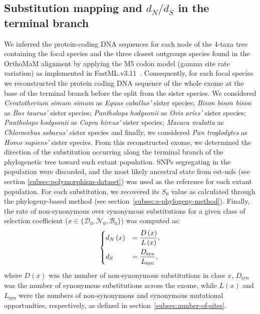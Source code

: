 \documentclass[9pt,twocolumn,twoside,lineno]{pnas-new}
\newcommand{\dn}{d_N}
\newcommand{\ds}{d_S}
\newcommand{\dnds}{\dn / \ds}
\newcommand{\Sphy}{S_{0}}
\newcommand{\SphyDel}{\mathcal{D}_0}
\newcommand{\SphyNeu}{\mathcal{N}_0}
\newcommand{\SphyBen}{\mathcal{B}_0}
\newcommand{\Sphyclass}{x}
\begin{document}
{       \subsection{Substitution mapping and $\dnds$ in the terminal branch}
       \label{subsec:substitution-mapping-in-the-terminal-branch}
       We inferred the protein-coding DNA sequences for each node of the 4-taxa tree containing the focal species and the three closest outgroups species found in the OrthoMaM alignment by applying the M5 codon model (gamma site rate variation) as implemented in FastML.v3.11~\cite{ashkenazy_fastml_2012}.
       Consequently, for each focal species we reconstructed the protein coding DNA sequence of the whole exome at the base of the terminal branch before the split from the sister species.
       We considered \textit{Ceratotherium simum simum} as \textit{Equus caballus'} sister species; \textit{Bison bison bison} as \textit{Bos taurus'} sister species; \textit{Pantholops hodgsonii} as \textit{Ovis aries'} sister species; \textit{Pantholops hodgsonii} as \textit{Capra hircus'} sister species; \textit{Macaca mulatta} as \textit{Chlorocebus sabaeus'} sister species and finally, we considered \textit{Pan troglodytes} as \textit{Homo sapiens'} sister species.
       From this reconstructed exome, we determined the direction of the substitution occurring along the terminal branch of the phylogenetic tree toward each extant population.
       SNPs segregating in the population were discarded, and the most likely ancestral state from est-usfs (see section \ref{subsec:polymorphism-dataset}) was used as the reference for each extant population.
       For each substitution, we recovered its $\Sphy$ value as calculated through the phylogeny-based method (see section~\ref{subsec:s-phylogeny-method}).
       Finally, the rate of non-synonymous over synonymous substitutions for a given class of selection coefficient ($\Sphyclass \in \{\SphyDel, \SphyNeu, \SphyBen \}$) was computed as:
       \begin{align}
              \begin{dcases}
                     \dn \left( \Sphyclass \right) &= \dfrac{D\left( \Sphyclass \right)}{L \left( \Sphyclass \right)}, \\
                     \ds &= \dfrac{D_{\text{syn}}}{L_{\text{syn}}},
              \end{dcases}\label{eq:dnds}
       \end{align}
       where $D \left( \Sphyclass \right) $ was the number of non-synonymous substitutions in class $\Sphyclass$, $D_{\text{syn}}$ was the number of synonymous substitutions across the exome, while $L \left( \Sphyclass \right)$ and $L_{\text{syn}}$ were the numbers of non-synonymous and synonymous mutational opportunities, respectively, as defined in section~\ref{subsec:nunber-of-sites}.
}
\end{document}
